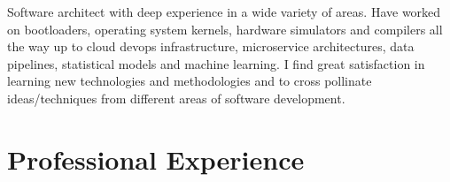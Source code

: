 \documentclass[11pt,a4paper,sans]{moderncv}        %
\begin{document}
\makecvtitle

Software architect with deep experience in a wide variety of areas. Have worked
on bootloaders, operating system kernels, hardware simulators and compilers all
the way up to cloud devops infrastructure, microservice architectures, data pipelines,
statistical models and machine learning. I find great satisfaction in learning
new technologies and methodologies and to cross pollinate ideas/techniques from
different areas of software development. 

\section{Professional Experience}
\end{document}
